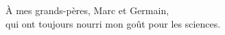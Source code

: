 
\begin{dedication}

    À mes grands-pères, Marc et Germain,\\ qui ont toujours nourri mon goût pour les sciences.

\end{dedication}